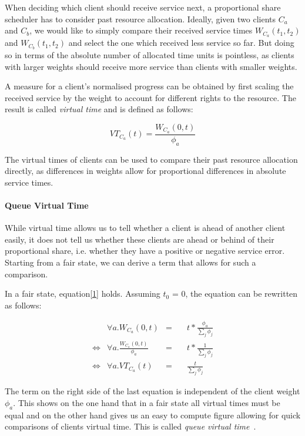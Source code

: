 When deciding which client should receive service next, a proportional share scheduler
has to consider past resource allocation. Ideally, given two clients $C_a$ and $C_b$, we would
like to simply compare their received service times $W_{C_a}(t_1 , t_2)$ and $W_{C_b}(t_1 , t_2)$ and select
the one which received less service so far. But doing so in terms of the absolute number of
allocated time units is pointless, as clients with larger weights should receive more service
than clients with smaller weights.

A measure for a client's normalised progress can be obtained by first scaling the received
service by the weight to account for different rights to the resource. The result is called
\emph{virtual time} \cite{dks89,nvz01} and is defined as follows:

\begin{equation}
  VT_{C_a}(t) = \frac{W_{C_a}(0 , t)}{\phi_a}
\end{equation}

The virtual times of clients can be used to compare their past resource allocation directly, as differences in weights allow for proportional differences in absolute service times.

\paragraph{Queue Virtual Time}

While virtual time allows us to tell whether a client is ahead of another client easily, it
does not tell us whether these clients are ahead or behind of their proportional share, i.e.
whether they have a positive or negative service error. Starting from a fair state, we can
derive a term that allows for such a comparison.

In a fair state, equation\eqref{1}  holds. Assuming $t_0$ = 0, the equation can be rewritten as
follows:

\begin{align}
                 &\forall  a. W_{C_a}(0, t) &= &\quad t*\frac{\phi_a}{\sum_j\phi_j} \nonumber\\
\Leftrightarrow  &\forall  a. \frac{W_{C_a}(0, t)}{\phi_a} &= &\quad t*\frac{1}{\sum_j\phi_j} \nonumber\\
\Leftrightarrow  &\forall  a. VT_{C_a}(t)  &= &\quad \frac{t}{\sum_j\phi_j}\nonumber
\end{align}

The term on the right side of the last equation is independent of the client weight $\phi_a$. This
shows on the one hand that in a fair state all virtual times must be equal and on the other
hand gives us an easy to compute figure allowing for quick comparisons of clients virtual
time. This is called \emph{queue virtual time}~\cite{nvz01}.

